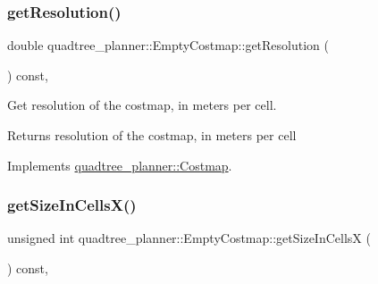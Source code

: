 \mbox{\label{classquadtree__planner_1_1EmptyCostmap_a2401c36e2f5c93fc9ae3dde9fc9ac930}} 
\subsubsection{\texorpdfstring{get\+Resolution()}{getResolution()}}
{\footnotesize\ttfamily double quadtree\+\_\+planner\+::\+Empty\+Costmap\+::get\+Resolution (\begin{DoxyParamCaption}{ }\end{DoxyParamCaption}) const\hspace{0.3cm}{\ttfamily [override]}, {\ttfamily [virtual]}}



Get resolution of the costmap, in meters per cell. 

\begin{DoxyReturn}{Returns}
resolution of the costmap, in meters per cell 
\end{DoxyReturn}


Implements \hyperlink{classquadtree__planner_1_1Costmap_aaef2845def8e7320a7fa576e9efab289}{quadtree\+\_\+planner\+::\+Costmap}.

\mbox{\label{classquadtree__planner_1_1EmptyCostmap_a41621ddd089ca5112d02c1315241534c}} 
\subsubsection{\texorpdfstring{get\+Size\+In\+Cells\+X()}{getSizeInCellsX()}}
{\footnotesize\ttfamily unsigned int quadtree\+\_\+planner\+::\+Empty\+Costmap\+::get\+Size\+In\+CellsX (\begin{DoxyParamCaption}{ }\end{DoxyParamCaption}) const\hspace{0.3cm}{\ttfamily [override]}, {\ttfamily [virtual]}}



